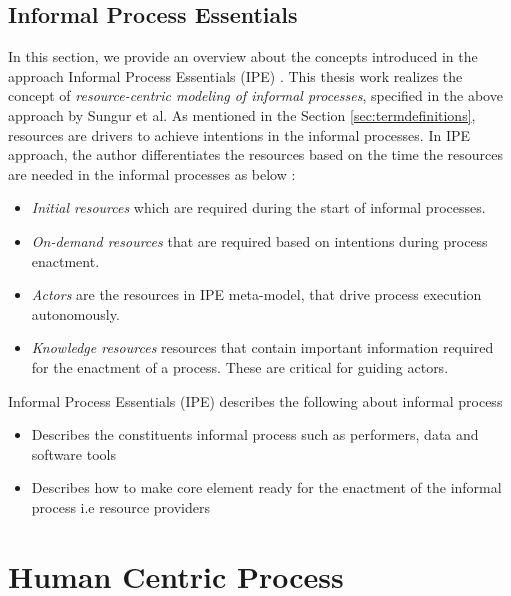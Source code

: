 \subsection{Informal Process Essentials}
\label{sec:informalprocessessentials}
In this section, we provide an overview about the concepts introduced in the approach Informal Process Essentials (IPE) \cite{Sungur2014a}. This thesis work realizes the concept of \textit{resource-centric modeling of informal processes}, specified in the above approach by Sungur et al.  As mentioned in the Section \ref{sec:termdefinitions}, resources are drivers to achieve intentions in the informal processes. In IPE approach, the author differentiates the resources based on the time the resources are needed in the informal processes as below :
  \begin{itemize}
  	\item \textit{Initial resources} which are required during the start of informal processes.
  	\item \textit{On-demand resources} that are required based on intentions during process enactment.
  	\item \textit{Actors} are the resources in IPE meta-model, that drive process execution autonomously.
  	\item \textit{Knowledge resources} resources that contain important information required for the enactment of a process. These are critical for guiding actors.  
  \end{itemize}
Informal Process Essentials (IPE) describes the following about informal process \cite{Sungur2014} 

\begin{itemize}
	\item Describes the constituents informal process such as performers, data and software tools
	\item Describes how to make core element ready for the enactment of the informal process i.e resource providers
\end{itemize}




\section{Human Centric Process}
\label{sec:humancentric}



